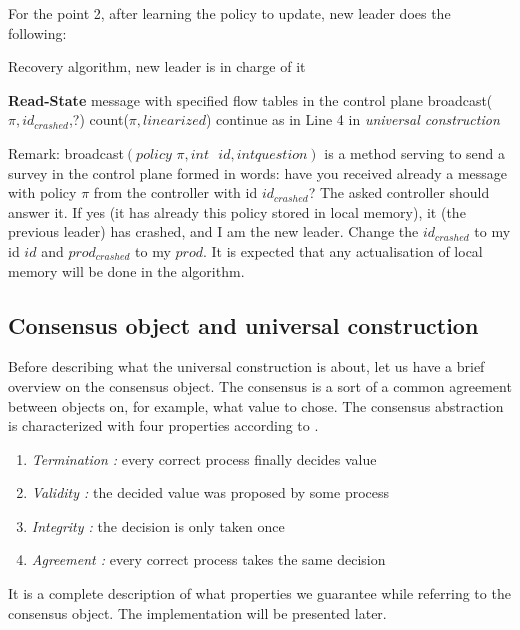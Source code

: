 \documentclass{article}
\theoremstyle{remark}
\begin{document}
For the point 2, after learning the policy to update, new leader does the following:\\
\begin{algorithm}
\caption{Recovery algorithm, new leader is in charge of it}
\begin{algorithmic}[1]
	\State \textbf{Read-State} message with specified flow tables
\EndFor
\State in the control plane broadcast($\pi , id_{crashed}$,?)
	\State count($\pi,linearized$)
	\EndIf
{}
\EndIf 
\State continue as in Line 4 in \emph{universal construction}
\end{algorithmic}
\end{algorithm}

Remark: broadcast$(\textit{policy }\pi, int \textit{ }id,int \textit{question})$ is a method serving to send a survey in the control plane formed in words: have you received already a message with policy $\pi$ from the controller with id $id_{crashed}$? The asked controller should answer it. If yes (it has already this policy stored in local memory), it (the previous leader) has crashed, and I am the new leader. Change the $id_{crashed}$ to my id $id$ and $prod_{crashed}$ to my $prod$.
It is expected that any actualisation of local memory will be done in the algorithm.
\subsection{Consensus object and universal construction}
Before describing what the universal construction is about, let us have a brief overview on the consensus object. The consensus is a sort of a common agreement between objects on, for example, what value to chose.
The consensus abstraction is characterized with four properties according to \cite{Guerraoui:2010:IRD:1951643}.
\begin{enumerate}
\item \emph{Termination :} every correct process finally decides value
\item \emph{Validity :} the decided value was proposed by some process
\item \emph{Integrity :} the decision is only taken once
\item \emph{Agreement :} every correct process takes the same decision
\end{enumerate}
It is a complete description of what properties we guarantee while referring to the consensus object. The implementation will be presented later.
\end{document}
